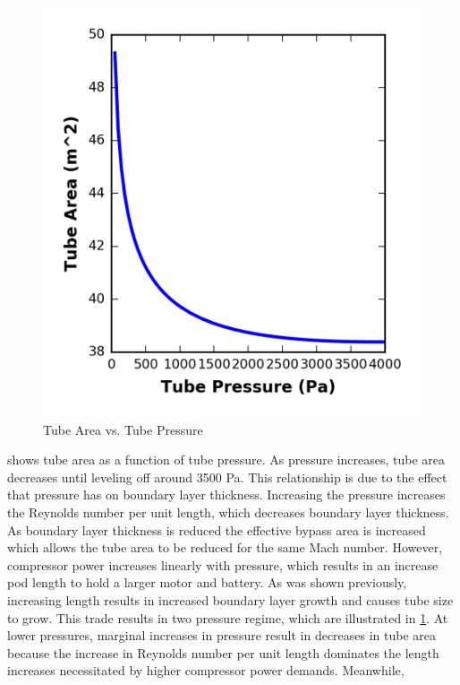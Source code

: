 \begin{figure}
	\centering
	\includegraphics{../../images/graphs/pressure_trades/pressure_vs_Area.png}
	\caption{Tube Area vs. Tube Pressure}
	\label{fig:tube_area_vs_tube_press}
\end{figure}
 shows tube area as a function of tube pressure.
As pressure increases, tube area decreases until leveling off around 3500 Pa.
This relationship is due to the effect that pressure has on boundary layer thickness.
Increasing the pressure increases the Reynolds number per unit length,
which decreases boundary layer thickness. As boundary layer thickness is
reduced the effective bypass area is increased which allows the tube area to
be reduced for the same Mach number. However, compressor power increases
linearly with pressure, which results in an increase pod length to hold a
larger motor and battery. As was shown previously, increasing length results in
increased boundary layer growth and causes tube size to grow. This trade
results in two pressure regime, which are illustrated in \cref{fig:tube_area_vs_tube_press}.
At lower pressures, marginal increases in pressure result in decreases in tube
area because the increase in Reynolds number per unit length dominates the
length increases necessitated by higher compressor power demands. Meanwhile,
